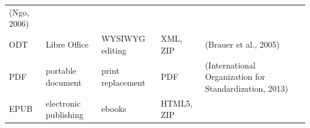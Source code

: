 \documentclass[10pt,fleqn]{wlpeerj}
\begin{document}
\begin{longtable}[]{@{}lllll@{}}
\begin{minipage}[t]{0.28\columnwidth}
(Ngo,
2006)\strut
\end{minipage}\tabularnewline
\begin{minipage}[t]{0.08\columnwidth}\raggedright\strut
ODT\strut
\end{minipage}
&
\begin{minipage}[t]{0.21\columnwidth}\raggedright\strut
Libre
Office\strut
\end{minipage}
&
\begin{minipage}[t]{0.16\columnwidth}\raggedright\strut
WYSIWYG
editing\strut
\end{minipage}
&
\begin{minipage}[t]{0.13\columnwidth}\raggedright\strut
XML,
ZIP\strut
\end{minipage}
&
\begin{minipage}[t]{0.28\columnwidth}\raggedright\strut
(Brauer
et
al.,
2005)\strut
\end{minipage}\tabularnewline
\begin{minipage}[t]{0.08\columnwidth}\raggedright\strut
PDF\strut
\end{minipage}
&
\begin{minipage}[t]{0.21\columnwidth}\raggedright\strut
portable
document\strut
\end{minipage}
&
\begin{minipage}[t]{0.16\columnwidth}\raggedright\strut
print
replacement\strut
\end{minipage}
&
\begin{minipage}[t]{0.13\columnwidth}\raggedright\strut
PDF\strut
\end{minipage}
&
\begin{minipage}[t]{0.28\columnwidth}\raggedright\strut
(International
Organization
for
Standardization,
2013)\strut
\end{minipage}\tabularnewline
\begin{minipage}[t]{0.08\columnwidth}\raggedright\strut
EPUB\strut
\end{minipage}
&
\begin{minipage}[t]{0.21\columnwidth}\raggedright\strut
electronic
publishing\strut
\end{minipage}
&
\begin{minipage}[t]{0.16\columnwidth}\raggedright\strut
ebooks\strut
\end{minipage}
&
\begin{minipage}[t]{0.13\columnwidth}\raggedright\strut
HTML5,
ZIP\strut
\end{minipage}
&
\begin{minipage}[t]{0.28\columnwidth}\raggedright\strut

\end{minipage}
\end{longtable}
\end{document}
